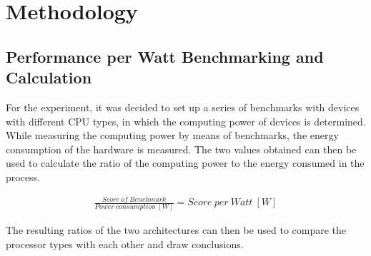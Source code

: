 \section{Methodology} \label{sec:methodology}




\subsection{Performance per Watt Benchmarking and Calculation}
For the experiment, it was decided to set up a series of benchmarks with devices with different CPU types, 
in which the computing power of devices is determined. 
While measuring the computing power by means of benchmarks, 
the energy consumption of the hardware is measured.
The two values obtained can then be used to calculate the ratio of the computing power to the energy consumed in the process. 

\begin{eqnarray}
    \frac{Score\: of\: Benchmark}{Power\: consumption\: [W]} = Score\: per\: Watt\: [W]
\end{eqnarray}

The resulting ratios of the two architectures can then be used to compare the processor types with each other and draw conclusions. 

